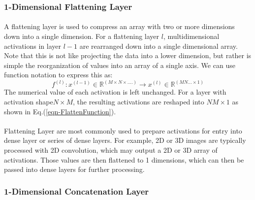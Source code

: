 \documentclass[12pt,letterpaper]{article}
\begin{document}
\subsubsection{1-Dimensional Flattening Layer}
\label{subsubsec-1DFlatten}

\paragraph*{}A flattening layer is used to compress an array with two or more dimensions down into a single dimension. For a flattening layer $l$, multidimensional activations in layer $l-1$ are rearranged down into a single dimensional array. Note that this is not like projecting the data into a lower dimension, but rather is simple the reorganization of values into an array of a single axis. We can use function notation to express this as:
\begin{equation}
\label{eqn-FlattenFunction}
f^{(l)} : x^{(l-1)} \in \mathbb{R}^{(M \times N \times ....)} \rightarrow
x^{(l)} \in \mathbb{R}^{(MN...\times 1)}
\end{equation}
The numerical value of each activation is left unchanged. For a layer with activation shape$N \times M$, the resulting activations are reshaped into $NM \times 1$ as shown in Eq.(\ref{eqn-FlattenFunction}).

\paragraph*{}Flattening Layer are most commonly used to prepare activations for entry into dense layer or series of dense layers. For example, 2D or 3D images are typically processed with 2D convolution, which may output a 2D or 3D array of activations. Those values are then flattened to 1 dimensions, which can then be passed into dense layers for further processing.


\subsubsection{1-Dimensional Concatenation Layer}
\label{subsubsec-1DConcat}
\end{document}
